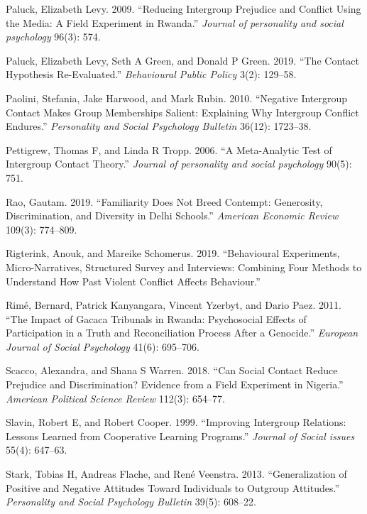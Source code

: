 \documentclass[11pt]{article}
\begin{document}
\begin{cslreferences}
\leavevmode\hypertarget{ref-paluck2009jsp}{}%
Paluck, Elizabeth Levy. 2009. ``Reducing Intergroup Prejudice and
Conflict Using the Media: A Field Experiment in Rwanda.'' \emph{Journal
of personality and social psychology} 96(3): 574.

\leavevmode\hypertarget{ref-paluck2019contact}{}%
Paluck, Elizabeth Levy, Seth A Green, and Donald P Green. 2019. ``The
Contact Hypothesis Re-Evaluated.'' \emph{Behavioural Public Policy}
3(2): 129--58.

\leavevmode\hypertarget{ref-paolini2010negative}{}%
Paolini, Stefania, Jake Harwood, and Mark Rubin. 2010. ``Negative
Intergroup Contact Makes Group Memberships Salient: Explaining Why
Intergroup Conflict Endures.'' \emph{Personality and Social Psychology
Bulletin} 36(12): 1723--38.

\leavevmode\hypertarget{ref-pettigrew2006meta}{}%
Pettigrew, Thomas F, and Linda R Tropp. 2006. ``A Meta-Analytic Test of
Intergroup Contact Theory.'' \emph{Journal of personality and social
psychology} 90(5): 751.

\leavevmode\hypertarget{ref-rao2019familiarity}{}%
Rao, Gautam. 2019. ``Familiarity Does Not Breed Contempt: Generosity,
Discrimination, and Diversity in Delhi Schools.'' \emph{American
Economic Review} 109(3): 774--809.

\leavevmode\hypertarget{ref-rigterink2019isa}{}%
Rigterink, Anouk, and Mareike Schomerus. 2019. ``Behavioural
Experiments, Micro-Narratives, Structured Survey and Interviews:
Combining Four Methods to Understand How Past Violent Conflict Affects
Behaviour.''

\leavevmode\hypertarget{ref-rime2011impact}{}%
Rimé, Bernard, Patrick Kanyangara, Vincent Yzerbyt, and Dario Paez.
2011. ``The Impact of Gacaca Tribunals in Rwanda: Psychosocial Effects
of Participation in a Truth and Reconciliation Process After a
Genocide.'' \emph{European Journal of Social Psychology} 41(6):
695--706.

\leavevmode\hypertarget{ref-scacco2018nigeria}{}%
Scacco, Alexandra, and Shana S Warren. 2018. ``Can Social Contact Reduce
Prejudice and Discrimination? Evidence from a Field Experiment in
Nigeria.'' \emph{American Political Science Review} 112(3): 654--77.

\leavevmode\hypertarget{ref-slavin1999improving}{}%
Slavin, Robert E, and Robert Cooper. 1999. ``Improving Intergroup
Relations: Lessons Learned from Cooperative Learning Programs.''
\emph{Journal of Social issues} 55(4): 647--63.

\leavevmode\hypertarget{ref-stark2013generalization}{}%
Stark, Tobias H, Andreas Flache, and René Veenstra. 2013.
``Generalization of Positive and Negative Attitudes Toward Individuals
to Outgroup Attitudes.'' \emph{Personality and Social Psychology
Bulletin} 39(5): 608--22.


\end{cslreferences}
\end{document}
